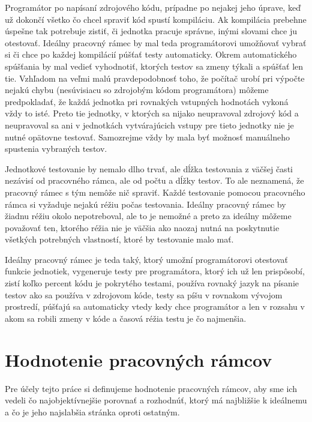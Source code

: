 \documentclass[11pt,twoside,slovak,a4paper]{article}
\begin{document}
		Programátor po napísaní zdrojového kódu, prípadne po nejakej jeho úprave, keď už dokončí všetko čo chcel spraviť kód spustí kompiláciu. Ak kompilácia prebehne úspešne tak potrebuje zistiť, či jednotka pracuje správne, inými slovami chce ju otestovať. Ideálny pracovný rámec by mal teda programátorovi umožňovať vybrať si či chce po každej kompilácií púšťať testy automaticky. Okrem automatického spúšťania by mal vedieť vyhodnotiť, ktorých testov sa zmeny týkali a spúšťať len tie. Vzhľadom na veľmi malú pravdepodobnosť toho, že počítač urobí pri výpočte nejakú chybu (nesúvisiacu so zdrojobým kódom programátora) môžeme predpokladať, že každá jednotka pri rovnakých vstupných hodnotách vykoná vždy to isté. Preto tie jednotky, v ktorých sa nijako neupravoval zdrojový kód a neupravoval sa ani v jednotkách vytvárajúcich vstupy pre tieto jednotky nie je nutné opätovne testovať. Samozrejme vždy by mala byť možnosť manuálneho spustenia vybraných testov.
				
		Jednotkové testovanie by nemalo dlho trvať, ale dĺžka testovania z väčšej časti nezávisí od pracovného rámca, ale od počtu a dĺžky testov. To ale neznamená, že pracovný rámec s tým nemôže nič spraviť. Každé testovanie pomocou pracovného rámca si vyžaduje nejakú réžiu počas testovania. Ideálny pracovný rámec by žiadnu réžiu okolo nepotreboval, ale to je nemožné a preto za ideálny môžeme považovať ten, ktorého réžia nie je väčšia ako naozaj nutná na poskytnutie všetkých potrebných vlastností, ktoré by testovanie malo mať. 
		
		Ideálny pracovný rámec je teda taký, ktorý umožní programátorovi otestovať funkcie jednotiek, vygeneruje testy pre programátora, ktorý ich už len prispôsobí, zistí koľko percent kódu je pokrytého testami, používa rovnaký jazyk na písanie testov ako sa používa v zdrojovom kóde, testy sa píšu v rovnakom vývojom prostredí, púšťajú sa automaticky vtedy kedy chce programátor a len v rozsahu v akom sa robili zmeny v kóde a časová réžia testu je čo najmenšia.
	
	\newpage
	\thispagestyle{plain}
	\section{Hodnotenie pracovných rámcov}	
	Pre účely tejto práce si definujeme hodnotenie pracovných rámcov, aby sme ich vedeli čo najobjektívnejšie porovnať a rozhodnúť, ktorý má najbližšie k ideálnemu a čo je jeho najslabšia stránka oproti ostatným.
	
\end{document}
